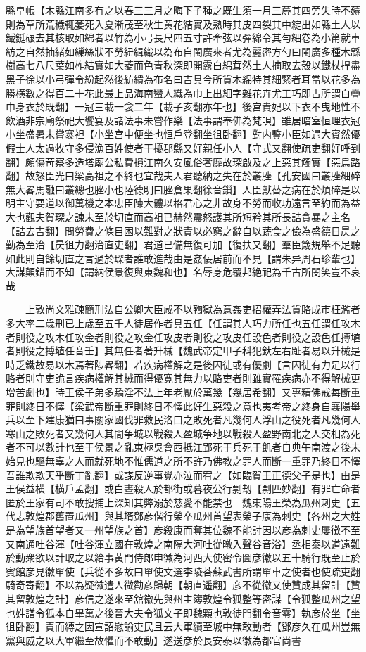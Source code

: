 緜皁帳【木緜江南多有之以春三三月之晦下子種之既生須一月三蓐其四旁失時不薅則為草所荒穢輒萎死入夏漸茂至秋生黄花結實及熟時其皮四裂其中綻出如緜土人以鐵鋌碾去其核取如綿者以竹為小弓長尺四五寸許牽弦以彈綿令其勻細卷為小筩就車紡之自然抽緒如繅絲狀不勞紐緝織以為布自閩廣來者尤為麗密方勺曰閩廣多種木緜樹高七八尺葉如柞結實如大菱而色青秋深即開露白綿茸然土人摘取去殻以鐵杖捍盡黑子徐以小弓彈令紛起然後紡繢為布名曰吉具今所貨木綿特其細緊者耳當以花多為勝横數之得百二十花此最上品海南蠻人織為巾上出細字雜花卉尤工巧即古所謂白疊巾身衣於既翻】一冠三載一衾二年【載子亥翻亦年也】後宫貴妃以下衣不曳地性不飲酒非宗廟祭祀大饗宴及諸法事未嘗作樂【法事謂奉佛為梵唄】雖居暗室恒理衣冠小坐盛暑未嘗褰袒【小坐宫中便坐也恒戶登翻坐徂卧翻】對内䜿小臣如遇大賓然優假士人太過牧守多侵漁百姓使者干擾郡縣又好親任小人【守式又翻使疏吏翻好呼到翻】頗傷苛察多造塔廟公私費損江南久安風俗奢靡故琛啟及之上惡其觸實【惡烏路翻】故怒臣光曰梁高祖之不終也宜哉夫人君聽納之失在於叢脞【孔安國曰叢脞細碎無大畧馬融曰叢總也脞小也陸德明曰脞倉果翻徐音鎻】人臣獻替之病在於煩碎是以明主守要道以御萬機之本忠臣陳大體以格君心之非故身不勞而收功遠言至約而為益大也觀夫賀琛之諫未至於切直而高祖已赫然震怒護其所短矜其所長詰貪暴之主名【詰去吉翻】問勞費之條目困以難對之狀責以必窮之辭自以蔬食之儉為盛德日昃之勤為至治【昃徂力翻治直吏翻】君道已備無復可加【復扶又翻】羣臣箴規舉不足聽如此則自餘切直之言過於琛者誰敢進哉由是姦佞居前而不見【謂朱异周石珍輩也】大謀顛錯而不知【謂納侯景復與東魏和也】名辱身危覆邦絶祀為千古所閔笑豈不哀哉

　　上敦尚文雅疎簡刑法自公卿大臣咸不以鞫獄為意姦吏招權弄法貨賂成市枉濫者多大率二歲刑已上歲至五千人徒居作者具五任【任謂其人巧力所任也五任謂任攻木者則役之攻木任攻金者則役之攻金任攻皮者則役之攻皮任設色者則役之設色任搏埴者則役之搏埴任音壬】其無任者著升械【魏武帝定甲子科犯釱左右趾者易以升械是時乏鐵故易以木焉著陟畧翻】若疾病權解之是後囚徒或有優劇【言囚徒有力足以行賂者則守吏詭言疾病權解其械而得優寛其無力以賂吏者則雖實罹疾病亦不得解械更增苦劇也】時王侯子弟多驕淫不法上年老厭於萬幾【幾居希翻】又專精佛戒每斷重罪則終日不懌【梁武帝斷重罪則終日不懌此好生惡殺之意也夷考帝之終身自襄陽舉兵以至下建康猶曰事關家國伐罪救民洛口之敗死者凡幾何人浮山之役死者凡幾何人寒山之敗死者又幾何人其間争城以戰殺人盈城争地以戰殺人盈野南北之人交相為死者不可以數計也至于侯景之亂東極吳會西抵江郢死于兵死于飢者自典午南渡之後未始見也驅無辜之人而就死地不惟儒道之所不許乃佛教之罪人而斷一重罪乃終日不懌吾誰欺欺天乎斷丁亂翻】或謀反逆事覺亦泣而宥之【如臨賀王正德父子是也】由是王侯益横【横戶孟翻】或白晝殺人於都街或暮夜公行剽刼【剽匹妙翻】有罪亡命者匿於王家有司不敢搜捕上深知其弊溺於慈愛不能禁也　魏東陽王榮為瓜州刺史【五代志敦煌郡舊置瓜州】與其壻鄧彦偕行榮卒瓜州首望表榮子康為刺史【各州之大姓是為望族首望者又一州望族之首】彦殺康而奪其位魏不能討因以彦為刺史屢徵不至又南通吐谷渾【吐谷渾立國在敦煌之南隔大河吐從暾入聲谷音浴】丞相泰以道遠難於動衆欲以計取之以給事黄門侍郎申徽為河西大使密令圖彦徽以五十騎行既至止於賓館彦見徽單使【兵從不多故曰單使文選李陵荅蘇武書所謂單車之使者也使疏吏翻騎奇寄翻】不以為疑徽遣人微勸彦歸朝【朝直遥翻】彦不從徽又使贊成其留計【贊其留敦煌之計】彦信之遂來至舘徽先與州主簿敦煌令狐整等密謀【令狐整瓜州之望也姓譜令狐本自畢萬之後晉大夫令狐文子即魏顆也敦徒門翻令音零】執彦於坐【坐徂卧翻】責而縛之因宣詔慰諭吏民且云大軍續至城中無敢動者【鄧彦久在瓜州豈無黨與威之以大軍繼至故懼而不敢動】遂送彦於長安泰以徽為都官尚書

